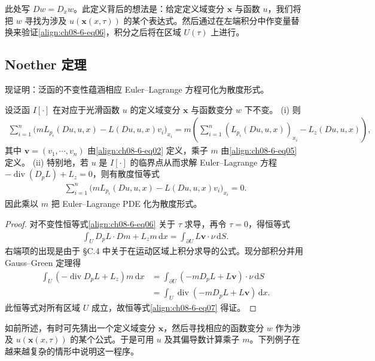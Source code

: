 \documentclass[../../main.tex]{subfiles}
\begin{document}
此处写 $Dw=D_xw$。此定义背后的想法是：给定定义域变分 $\mathbf{x}$ 与函数 $u$，我们将把 $w$ 寻找为涉及 $u(\mathbf{x}(x,\tau))$ 的某个表达式。然后通过在左端积分中作变量替换来验证\eqref{align:ch08-6-eq06}，积分之后将在区域 $U(\tau)$ 上进行。

\subsection{Noether 定理}\label{subsection:ch08-6-2-Noether定理}

现证明：泛函的不变性蕴涵相应 Euler--Lagrange 方程可化为散度形式。

\begin{theorem}[Noether 定理]\label{theorem:ch08-6-1-Noether}
设泛函 $I[\cdot]$ 在对应于光滑函数 $u$ 的定义域变分 $\mathbf{x}$ 与函数变分 $w$ 下不变。
(i) 则
\begin{align}
\sum_{i=1}^n\big(mL_{p_i}(Du,u,x)-L(Du,u,x)v_i\big)_{x_i}=m\left(\sum_{i=1}^n(L_{p_i}(Du,u,x))_{x_i}-L_z(Du,u,x)\right),\label{align:ch08-6-eq07}
\end{align}
其中 $\mathbf{v}=(v_1,\cdots,v_n)$ 由\eqref{align:ch08-6-eq02} 定义，乘子 $m$ 由\eqref{align:ch08-6-eq05} 定义。
(ii) 特别地，若 $u$ 是 $I[\cdot]$ 的临界点从而求解 Euler--Lagrange 方程 $-\operatorname{div}(D_pL)+L_z=0$，则有散度恒等式
\begin{align}
\sum_{i=1}^n\big(mL_{p_i}(Du,u,x)-L(Du,u,x)v_i\big)_{x_i}=0.\label{align:ch08-6-eq08}
\end{align}
因此乘以 $m$ 把 Euler--Lagrange PDE 化为散度形式。
\begin{proof}
对不变性恒等式\eqref{align:ch08-6-eq06} 关于 $\tau$ 求导，再令 $\tau=0$，得恒等式
\begin{align*}
\int_U D_pL\cdot Dm+L_zm\,\mathrm{d}x=\int_{\partial U}L\mathbf{v}\cdot\nu\,\mathrm{d}S.
\end{align*}
右端项的出现是由于 \S C.4 中关于在运动区域上积分求导的公式。现分部积分并用 Gauss--Green 定理得
\begin{align*}
\int_U(-\operatorname{div}D_pL+L_z)m\,\mathrm{d}x&=\int_{\partial U}(-mD_pL+L\mathbf{v})\cdot\nu\,\mathrm{d}S\\
&=\int_U\operatorname{div}(-mD_pL+L\mathbf{v})\,\mathrm{d}x.
\end{align*}
此恒等式对所有区域 $U$ 成立，故恒等式\eqref{align:ch08-6-eq07} 得证。
\end{proof}
\end{theorem}

如前所述，有时可先猜出一个定义域变分 $\mathbf{x}$，然后寻找相应的函数变分 $w$ 作为涉及 $u(\mathbf{x}(x,\tau))$ 的某个公式。于是可用 $u$ 及其偏导数计算乘子 $m$。下列例子在越来越复杂的情形中说明这一程序。
\end{document}
